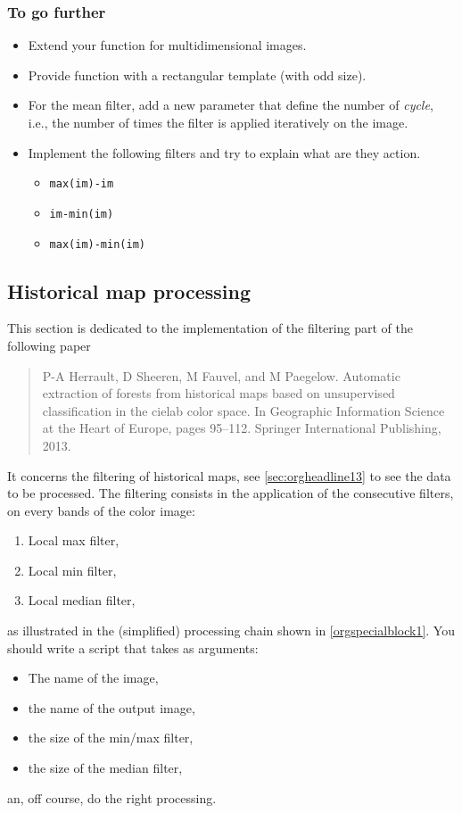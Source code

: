 \documentclass[a4paper,11pt,DIV=18]{scrartcl}
\begin{document}
\subsubsection{To go further}
\label{sec:orgheadline40}
\begin{itemize}
\item Extend your function for multidimensional images.
\item Provide function with a rectangular template (with odd size).
\item For the mean filter, add a new parameter that define the number of
\emph{cycle}, i.e., the number of times the filter is applied iteratively
on the image.
\item Implement the  following filters  and try to  explain what  are they
action.
\begin{itemize}
\item \texttt{max(im)-im}
\item \texttt{im-min(im)}
\item \texttt{max(im)-min(im)}
\end{itemize}
\end{itemize}
\subsection{Historical map processing}
\label{sec:orgheadline43}
This section is dedicated to the implementation of the filtering part of the following paper 
\begin{quote}
P-A  Herrault,  D  Sheeren,  M   Fauvel,  and  M  Paegelow.  Automatic
extraction  of  forests from  historical  maps  based on  unsupervised
classification in  the cielab  color space. In  Geographic Information
Science at the Heart of  Europe, pages 95--112. Springer International
Publishing, 2013.
\end{quote}

It concerns the filtering of  historical maps, see \ref{sec:orgheadline13} to see
the data to be processed. The filtering consists in the application of
the consecutive filters, on every bands of the color image:
\begin{enumerate}
\item Local max filter,
\item Local min filter,
\item Local median filter,
\end{enumerate}
as  illustrated   in  the  (simplified)  processing   chain  shown  in
\ref{orgspecialblock1}. You should write a script that takes as arguments:
\begin{itemize}
\item The name of the image,
\item the name of the output image,
\item the size of the min/max filter,
\item the size of the median filter,
\end{itemize}
an, off course, do the right processing.
\end{document}
